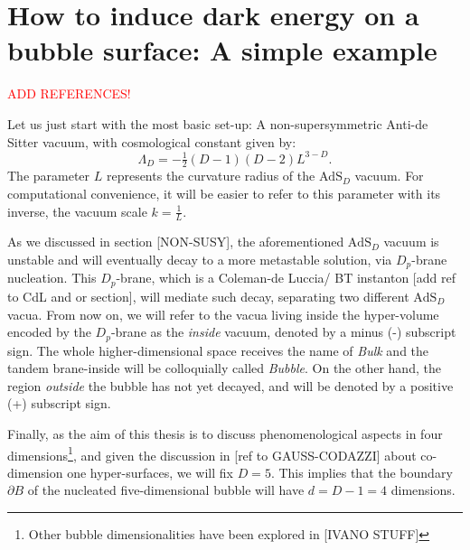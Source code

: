 \section{How to induce dark energy on a bubble surface: A simple example}\label{sec: simple_example}

\textcolor{red}{ADD REFERENCES!}

Let us just start with the most basic set-up: A non-supersymmetric Anti-de Sitter vacuum, with cosmological constant given by:
\begin{equation}
	\Lambda_{D} = - \tfrac{1}{2}(D-1)(D-2)L^{3-D}.
\end{equation}
The parameter $L$ represents the curvature radius of the $\text{AdS}_{D}$ vacuum. For computational convenience, it will be easier to refer to this parameter with its inverse, the vacuum scale $k = \tfrac{1}{L}$.

As we discussed in section [NON-SUSY], the aforementioned $\text{AdS}_{D}$ vacuum is unstable and will eventually decay to a more metastable solution, via $D_{p}$-brane nucleation. This $D_{p}$-brane, which is a Coleman-de Luccia/ BT instanton [add ref to CdL and or section], will mediate such decay, separating two different $\text{AdS}_{D}$ vacua. From now on, we will refer to the vacua living inside the hyper-volume encoded by the $D_{p}$-brane as the \textit{inside} vacuum, denoted by a minus (-) subscript sign. The whole higher-dimensional space receives the name of \textit{Bulk} and the tandem brane-inside will be colloquially called \textit{Bubble}. On the other hand, the region \textit{outside} the bubble has not yet decayed, and will be denoted by a positive (+) subscript sign.

%	  

Finally, as the aim of this thesis is to discuss phenomenological aspects in four dimensions\footnote{Other bubble dimensionalities have been explored in [IVANO STUFF]}, and given the discussion in [ref to GAUSS-CODAZZI] about co-dimension one hyper-surfaces, we will fix $D=5$. This implies that the boundary $\partial B$ of the nucleated five-dimensional bubble will have $d = D-1 = 4$ dimensions.

